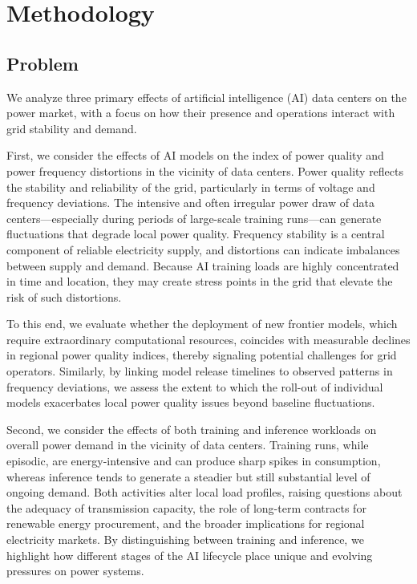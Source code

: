 \documentclass[sigconf,authordraft]{acmart}
\begin{document}
\section{Methodology}

\subsection{Problem}

We analyze three primary effects of artificial intelligence (AI) data centers on the power market, with a focus on how their presence and operations interact with grid stability and demand. 

First, we consider the effects of AI models on the index of power quality and power frequency distortions in the vicinity of data centers. Power quality reflects the stability and reliability of the grid, particularly in terms of voltage and frequency deviations. The intensive and often irregular power draw of data centers—especially during periods of large-scale training runs—can generate fluctuations that degrade local power quality. Frequency stability is a central component of reliable electricity supply, and distortions can indicate imbalances between supply and demand. Because AI training loads are highly concentrated in time and location, they may create stress points in the grid that elevate the risk of such distortions. 
 
 To this end, we evaluate whether the deployment of new frontier models, which require extraordinary computational resources, coincides with measurable declines in regional power quality indices, thereby signaling potential challenges for grid operators. Similarly, by linking model release timelines to observed patterns in frequency deviations, we assess the extent to which the roll-out of individual models exacerbates local power quality issues beyond baseline fluctuations.

Second, we consider the effects of both training and inference workloads on overall power demand in the vicinity of data centers. Training runs, while episodic, are energy-intensive and can produce sharp spikes in consumption, whereas inference tends to generate a steadier but still substantial level of ongoing demand. Both activities alter local load profiles, raising questions about the adequacy of transmission capacity, the role of long-term contracts for renewable energy procurement, and the broader implications for regional electricity markets. By distinguishing between training and inference, we highlight how different stages of the AI lifecycle place unique and evolving pressures on power systems.
\end{document}
